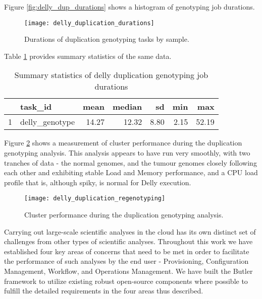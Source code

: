 Figure \ref{fig:delly_dup_durations} shows a histogram of genotyping job durations.

\begin{figure}[H]
\texttt{[image: delly\_duplication\_durations]}
\centering
\caption {Durations of duplication genotyping tasks by sample.}
\label{fig:delly_duplication_durations}
\end{figure}

Table \ref{tab:delly_duplication_summary_stats} provides summary statistics of the same data.

\begin{table}[H]
\caption {Summary statistics of delly duplication genotyping job durations} \label{tab:delly_duplication_summary_stats}
\centering
\begin{tabular}{rlrrrrr}
  \hline
 & task\_id & mean & median & sd & min & max \\ 
  \hline
1 & delly\_genotype & 14.27 & 12.32 & 8.80 & 2.15 & 52.19 \\ 
   \hline
\end{tabular}
\end{table}

Figure \ref{fig:delly_duplication_regenotyping} shows a measurement of cluster performance during the duplication genotyping analysis. This analysis appears to have run very smoothly, with two tranches of data - the normal genomes, and the tumour genomes closely following each other and exhibiting stable Load and Memory performance, and a CPU load profile that is, although spiky, is normal for Delly execution.

\begin{figure}[H]
\texttt{[image: delly\_duplication\_regenotyping]}
\centering
\caption {Cluster performance during the duplication genotyping analysis.}
\label{fig:delly_duplication_regenotyping}
\end{figure}

Carrying out large-scale scientific analyses in the cloud has its own distinct set of challenges from other types of scientific analyses. Throughout this work we have established four key areas of concerns that need to be met in order to facilitate the performance of such analyses by the end user - Provisioning, Configuration Management, Workflow, and Operations Management. We have built the Butler framework to utilize existing robust open-source components where possible to fulfill the detailed requirements in the four areas thus described.

